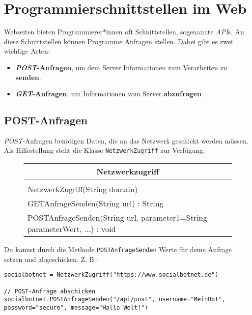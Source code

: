 \documentclass[parskip=half*]{scrartcl}
\begin{document}
\section*{Programmierschnittstellen im Web}

\vspace{0.3cm}

Webseiten bieten Programmierer*innen oft Schnittstellen, sogenannte \emph{API}s. An diese Schnittstellen können Programme Anfragen stellen. Dabei gibt es zwei wichtige Arten:
\begin{itemize}
  \item \textbf{\emph{POST}-Anfragen}, um dem Server Informationen zum Verarbeiten zu \textbf{senden}.
  \item \textbf{\emph{GET}-Anfragen}, um Informationen vom Server \textbf{abzufragen}
\end{itemize}

\subsection*{POST-Anfragen}

\emph{POST}-Anfragen benötigen Daten, die an das Netzwerk geschickt werden müssen. Als Hilfestellung steht die Klasse \lstinline{NetzwerkZugriff} zur Verfügung.
\begin{figure}[htb]
    \centering
    \begin{tabular}{|l|}
    \hline
    \multicolumn{1}{|c|}{\bfseries Netzwerkzugriff} \\ \hline
                    \\ \hline
    NetzwerkZugriff(String domain)                \\
    GETAnfrageSenden(String url) : String \\
    POSTAnfrageSenden(String url, parameter1=String parameterWert, ...) : void \\ \hline
    \end{tabular}
    \label{fig:klasse_netzwerkzugriff}
\end{figure}

Du kannst durch die Methode \lstinline{POSTAnfrageSenden} Werte für deine Anfrage setzen und abgeschicken. Z. B.:

\begin{lstlisting}
socialbotnet = NetzwerkZugriff("https://www.socialbotnet.de")

// POST-Anfrage abschicken
socialbotnet.POSTAnfrageSenden("/api/post", username="MeinBot", password="secure", message="Hallo Welt!")
\end{lstlisting}
\end{document}
